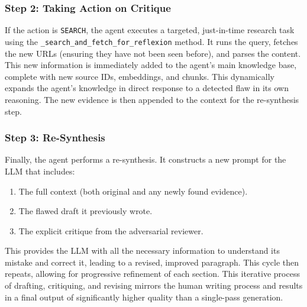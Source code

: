 \documentclass[12pt, a4paper]{article}
\begin{document}
\subsubsection{Step 2: Taking Action on Critique}
If the action is \texttt{SEARCH}, the agent executes a targeted, just-in-time research task using the \texttt{\_search\_and\_fetch\_for\_reflexion} method. It runs the query, fetches the new URLs (ensuring they have not been seen before), and parses the content. This new information is immediately added to the agent's main knowledge base, complete with new source IDs, embeddings, and chunks. This dynamically expands the agent's knowledge in direct response to a detected flaw in its own reasoning. The new evidence is then appended to the context for the re-synthesis step.

\subsubsection{Step 3: Re-Synthesis}
Finally, the agent performs a re-synthesis. It constructs a new prompt for the LLM that includes:
\begin{enumerate}
    \item The full context (both original and any newly found evidence).
    \item The flawed draft it previously wrote.
    \item The explicit critique from the adversarial reviewer.
\end{enumerate}
This provides the LLM with all the necessary information to understand its mistake and correct it, leading to a revised, improved paragraph. This cycle then repeats, allowing for progressive refinement of each section. This iterative process of drafting, critiquing, and revising mirrors the human writing process and results in a final output of significantly higher quality than a single-pass generation.
\end{document}

